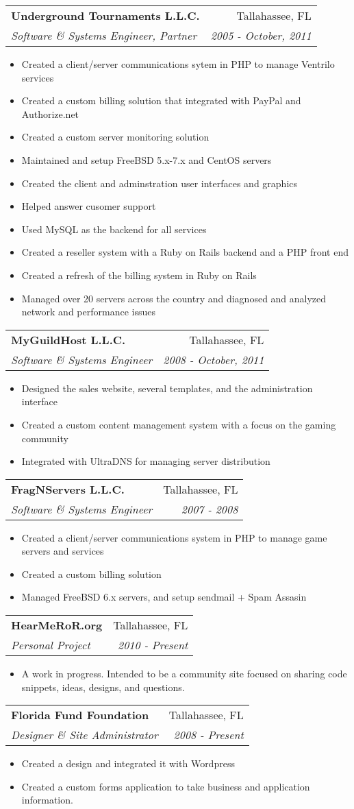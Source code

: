\documentclass[letterpaper,11pt]{article}
\makeatletter
\newcommand{\resitem}[1]{\item #1 \vspace{-2pt}}
\newcommand{\ressubheading}[4]{
\begin{tabular*}{7.0in}{l@{\extracolsep{\fill}}r}
		\textbf{#1} & #2 \\
		\textit{#3} & \textit{#4} \\
\end{tabular*}\vspace{-6pt}}
\makeatother
\begin{document}
\ressubheading{Underground Tournaments L.L.C.}{Tallahassee, FL}{Software \& Systems Engineer, Partner}{2005 - October, 2011}
\begin{itemize} 
        \resitem{Created a client/server communications sytem in PHP to manage Ventrilo services} 
        \resitem{Created a custom billing solution that integrated with PayPal and Authorize.net}
        \resitem{Created a custom server monitoring solution}
        \resitem{Maintained and setup FreeBSD 5.x-7.x and CentOS servers}
        \resitem{Created the client and adminstration user interfaces and graphics}
        \resitem{Helped answer cusomer support}
        \resitem{Used MySQL as the backend for all services}
        \resitem{Created a reseller system with a Ruby on Rails backend and a PHP front end}
        \resitem{Created a refresh of the billing system in Ruby on Rails}
        \resitem{Managed over 20 servers across the country and diagnosed and analyzed network and performance issues}
\end{itemize}

\ressubheading{MyGuildHost L.L.C.}{Tallahassee, FL}{Software \& Systems Engineer}{2008 - October, 2011}
\begin{itemize} 
        \resitem{Designed the sales website, several templates, and the administration interface}
        \resitem{Created a custom content management system with a focus on the gaming community}
        \resitem{Integrated with UltraDNS for managing server distribution}
\end{itemize}


\ressubheading{FragNServers L.L.C.}{Tallahassee, FL}{Software \& Systems Engineer}{2007 - 2008}
\begin{itemize} 
        \resitem{Created a client/server communications system in PHP to manage game servers and services}
        \resitem{Created a custom billing solution}
        \resitem{Managed FreeBSD 6.x servers, and setup sendmail + Spam Assasin}
\end{itemize}

\ressubheading{HearMeRoR.org}{Tallahassee, FL}{Personal Project}{2010 - Present}
\begin{itemize} 
        \resitem{A work in progress. Intended to be a community site focused on sharing code snippets, ideas, designs, and questions.}
\end{itemize}

\ressubheading{Florida Fund Foundation}{Tallahassee, FL}{Designer \& Site Administrator}{2008 - Present}
\begin{itemize} 
        \resitem{Created a design and integrated it with Wordpress}
        \resitem{Created a custom forms application to take business and application information.}
\end{itemize}
\end{document}
